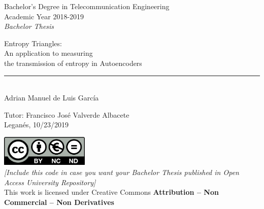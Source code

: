 \documentclass[12pt]{report}
\begin{document}
	
\begin{titlepage}
	\begin{sffamily}
	\color{azulUC3M}
	\begin{center}
		\begin{figure}[H] %
		\end{figure}
		\vspace{2.5cm}
		\begin{Large}
			Bachelor's Degree in Telecommunication Engineering\\			
			Academic Year 2018-2019\\
			\vspace{2cm}		
			\textsl{Bachelor Thesis}
			\bigskip
			
		\end{Large}
		 	{\Huge Entropy Triangles:}\\
		 	{\Large An application to measuring\\the transmission of entropy in Autoencoders}\\
		 	\vspace*{0.5cm}
	 		\rule{10.5cm}{0.1mm}\\
			\vspace*{0.9cm}
			{\LARGE Adrian Manuel de Luis García}\\ 
			\vspace*{1cm}
		\begin{Large}
			Tutor: Francisco Jos\'e Valverde Albacete\\
			Legan\'es, 10/23/2019\\
		\end{Large}
	\end{center}
	\vfill
	\color{black}
	\includegraphics[width=4.2cm]{imagenes/creativecommons.png}\\  %
	\emph{[Include this code in case you want your Bachelor Thesis published in Open Access University Repository]}\\ %
	This work is licensed under Creative Commons \textbf{Attribution – Non Commercial – Non Derivatives}
	\end{sffamily}
\end{titlepage}
\end{document}
